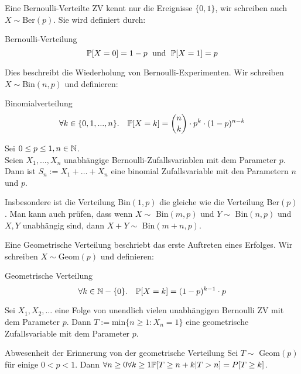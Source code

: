 Eine Bernoulli-Verteilte ZV kennt nur die Ereignisse $\{0,1\}$, wir schreiben auch $X \sim \text{Ber}(p)$. Sie wird definiert durch: 
\begin{mainbox}{Bernoulli-Verteilung}
    $$\mathbb{P}[X = 0] = 1 - p \; \text{ und } \; \mathbb{P}[X = 1] = p$$
\end{mainbox}

 Dies beschreibt die Wiederholung von Bernoulli-Experimenten. Wir schreiben $X \sim \text{Bin}(n,p)$ und definieren:

 \begin{mainbox}{Binomialverteilung}
    $$\forall k \in \{0, 1, ..., n\}. \quad \mathbb{P}[X = k] = \binom{n}{k} \cdot p^k \cdot (1-p)^{n-k}$$
 \end{mainbox}

 \begin{subbox}{}
    Sei $0 \leq p \leq 1, n \in \mathbb{N}$. \\
    Seien $X_1, \ldots , X_n$ unabhängige Bernoulli-Zufallsvariablen mit dem Parameter $p$. \\ Dann
    ist $S_n := X_1 + \ldots + X_n$
    eine binomial Zufallsvariable mit den Parametern $n$ und $p$.
\end{subbox}

Insbesondere ist die Verteilung Bin$(1, p)$ die gleiche wie die Verteilung Ber$(p)$. Man kann auch prüfen, dass wenn $X \sim$ Bin$(m, p)$ und $Y \sim$ Bin$(n, p)$ und $X, Y$ unabhängig sind, dann $X + Y \sim$ Bin$(m + n, p)$.

 Eine Geometrische Verteilung beschriebt das erste Auftreten eines Erfolges. Wir schreiben $X \sim \text{Geom}(p)$ und definieren:

\begin{mainbox}{Geometrische Verteilung}
    $$\forall k \in \mathbb{N} - \{0\}. \quad \mathbb{P}[X = k] = (1-p)^{k-1} \cdot p$$
\end{mainbox}

\begin{subbox}{}
    Sei $X_1, X_2, \ldots$ eine Folge von unendlich vielen unabhängigen Bernoulli ZV mit dem Parameter $p$. Dann
    $T := \text{min}\{n \geq 1 : X_n = 1\}$
    eine geometrische Zufallsvariable mit dem Parameter $p$.
\end{subbox}

\begin{subbox}{Abwesenheit der Erinnerung von der geometrische Verteilung}
    Sei $T \sim$ Geom$(p)$ für einige $0 < p < 1$. Dann
    $\forall n \geq 0 \forall k \geq 1 \mathbb{P}[T \geq n + k | T > n] = P[T \geq k]$.
\end{subbox}

